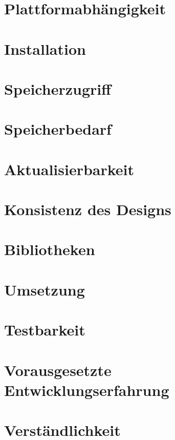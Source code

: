 \section{Plattformabhängigkeit} \label{sec:6-plattform}


\section{Installation} \label{sec:6-installation}


\section{Speicherzugriff} \label{sec:6-speicherzugriff}


\section{Speicherbedarf} \label{sec:6-speicherbedarf}


\section{Aktualisierbarkeit} \label{sec:6-aktualisierbarkeit}


\section{Konsistenz des Designs} \label{sec:6-konsistenz-des-designs}


\section{Bibliotheken} \label{sec:6-bibliotheken}


\section{Umsetzung} \label{sec:6-umsetzung}


\section{Testbarkeit} \label{sec:6-testbarkeit}


\section{Vorausgesetzte Entwicklungserfahrung} \label{sec:6-vorausgesetzte-entwicklungserfahrung}


\section{Verständlichkeit} \label{sec:6-verstaendlichkeit}

